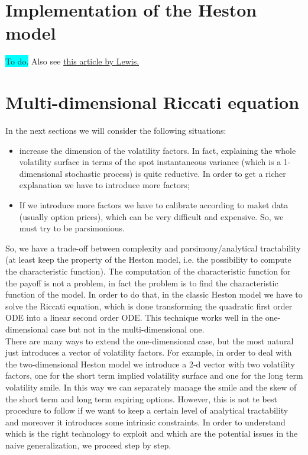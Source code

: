 \section{Implementation of the Heston model}
\colorbox{cyan}{To do.} Also see \href{http://www.optioncity.net/pubs/Ch2Excerpt.pdf}{this article by Lewis.}

\section{Multi-dimensional Riccati equation}
In the next sections we will consider the following situations:
\begin{itemize}
    \item increase the dimension of the volatility factors. In fact, explaining the whole volatility surface in terms of the spot instantaneous variance (which is a 1-dimensional stochastic process) is quite reductive. In order to get a richer explanation we have to introduce more factors;
    \item If we introduce more factors we have to calibrate according to maket data (usually option prices), which can be very difficult and expensive. So, we must try to be parsimonious.
\end{itemize}
So, we have a trade-off between complexity and parsimony/analytical tractability (at least keep the property of the Heston model, i.e. the possibility to compute the characteristic function). The computation of the characteristic function for the payoff is not a problem, in fact the problem is to find the characteristic function of the model. In order to do that, in the classic Heston model we have to solve the Riccati equation, which is done transforming the quadratic first order ODE into a linear second order ODE. This technique works well in the one-dimensional case but not in the multi-dimensional one.  \\
There are many ways to extend the one-dimensional case, but the most natural just introduces a vector of volatility factors. For example, in order to deal with the two-dimensional Heston model we introduce a 2-d vector with two volatility factors, one for the short term implied volatility surface and one for the long term volatility smile. In this way we can separately manage the smile and the skew of the short term and long term expiring options. However, this is not te best procedure to follow if we want to keep a certain level of analytical tractability and moreover it introduces some intrinsic constraints. In order to understand which is the right technology to exploit and which are the potential issues in the naive generalization, we proceed step by step.\\
